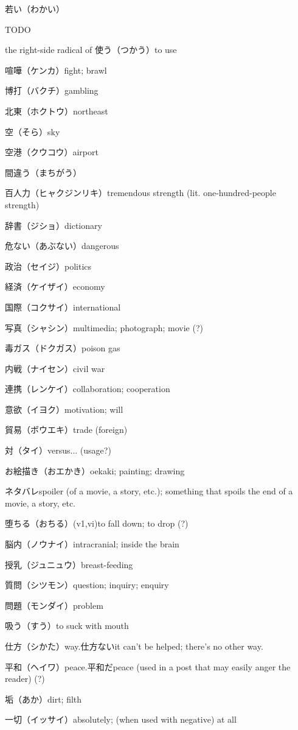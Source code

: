 若い（わかい）

TODO

the right-side radical of 使う（つかう）to use

喧嘩（ケンカ）fight; brawl

博打（バクチ）gambling

北東（ホクトウ）northeast

空（そら）sky

空港（クウコウ）airport

間違う（まちがう）

百人力（ヒャクジンリキ）tremendous strength (lit. one-hundred-people strength)

辞書（ジショ）dictionary

危ない（あぶない）dangerous

政治（セイジ）politics

経済（ケイザイ）economy

国際（コクサイ）international

写真（シャシン）multimedia; photograph; movie (?)

毒ガス（ドクガス）poison gas

内戦（ナイセン）civil war

連携（レンケイ）collaboration; cooperation

意欲（イヨク）motivation; will

貿易（ボウエキ）trade (foreign)

対（タイ）versus... (usage?)

お絵描き（おエかき）oekaki; painting; drawing

ネタバレspoiler (of a movie, a story, etc.); something that spoils the end of a movie, a story, etc.

堕ちる（おちる）(v1,vi)to fall down; to drop (?)

脳内（ノウナイ）intracranial; inside the brain

授乳（ジュニュウ）breast-feeding

質問（シツモン）question; inquiry; enquiry

問題（モンダイ）problem

吸う（すう）to suck with mouth

仕方（シかた）way.仕方ないit can't be helped; there's no other way.

平和（ヘイワ）peace.平和だpeace (used in a post that may easily anger the reader) (?)

垢（あか）dirt; filth

一切（イッサイ）absolutely; (when used with negative) at all

